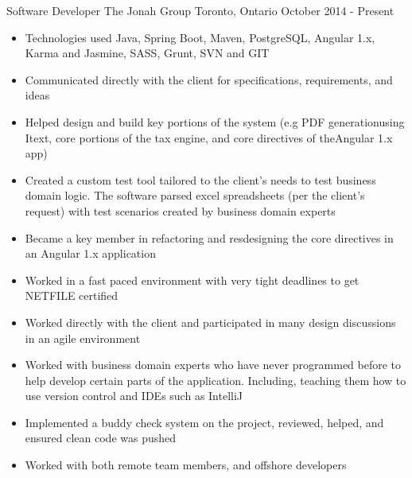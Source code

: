 \begin{cventries}
    \cventry
    {Software Developer}
    {The Jonah Group}
    {Toronto, Ontario}
    {October 2014 - Present}
    {
        \renewcommand{\labelitemii}{\bullet}
        \begin{cvitems}
            \item[] {
                \begin{itemize}
                    \item {Technologies used Java, Spring Boot, Maven, PostgreSQL, Angular 1.x, Karma and Jasmine, SASS, Grunt, SVN and GIT}
                    \item {Communicated directly with the client for specifications, requirements, and ideas}
                    \item {Helped design and build key portions of the system (e.g PDF generationusing Itext, core portions of the tax engine, and core directives of theAngular 1.x app)}
                    \item {Created a custom test tool tailored to the client’s needs to test business domain logic. The software parsed excel spreadsheets
                            (per the client’s request) with test scenarios created by business domain experts}
                    \item {Became a key member in refactoring and resdesigning the core directives in an Angular 1.x application}
                    \item {Worked in a fast paced environment with very tight deadlines to get NETFILE certified}
                    \item {Worked directly with the client and participated in many design discussions in an agile environment}
                    \item {Worked with business domain experts who have never programmed before to help develop certain parts of the application. Including, teaching them how to use version control and IDEs such as IntelliJ}
                    \item {Implemented a buddy check system on the project, reviewed, helped, and ensured clean code was pushed}
                    \item {Worked with both remote team members, and offshore developers}
                \end{itemize}
            }
            \item[] {
                \begin{itemize}

\end{itemize}}
\end{cvitems}}
\end{cventries}
